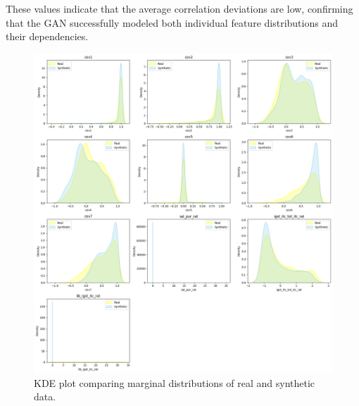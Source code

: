 \documentclass[12pt, a4paper, twocolumn]{article}
\begin{document}
These values indicate that the average correlation deviations are low, confirming that the GAN successfully modeled both individual feature distributions and their dependencies.

\begin{figure}
\centering
\includegraphics[width=0.9\linewidth]{output.png}
\caption{KDE plot comparing marginal distributions of real and synthetic data.}
\label{fig:kde_plot}
\end{figure}
\end{document}
